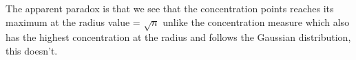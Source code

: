 \documentclass[10pt]{article}
\begin{document}
\begin{flushleft}
\begin{figure}[!htb]
\begin{floatrow}
    \end{floatrow}
\end{figure}
The apparent paradox is that we see that the concentration points reaches its maximum at the radius value = $\sqrt{n}$ unlike the concentration measure which also has the highest concentration at the radius and follows the Gaussian distribution, this doesn't.\\
\end{flushleft}
\end{document}

